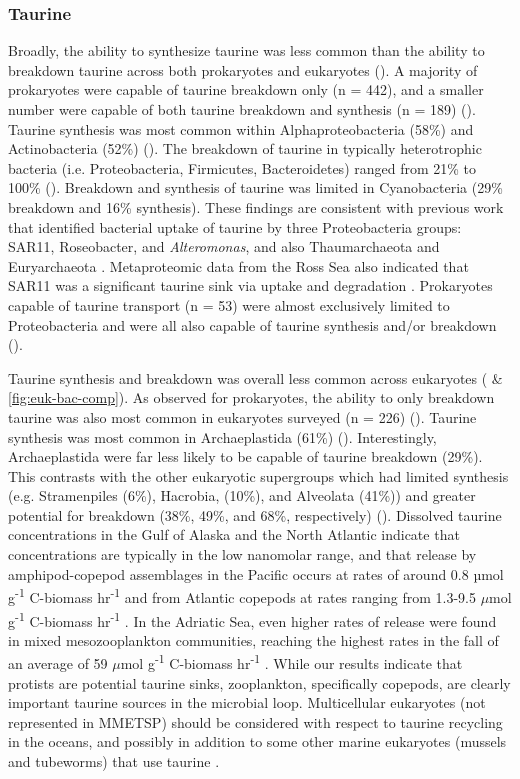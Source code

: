 \documentclass[utf8]{frontiersSCNS} %
\begin{document}
\subsubsection*{Taurine}
Broadly, the ability to synthesize taurine was less common than the ability to breakdown taurine across both prokaryotes and eukaryotes (). A majority of prokaryotes were capable of taurine breakdown only (n = 442), and a smaller number were capable of both taurine breakdown and synthesis (n = 189) (). Taurine synthesis was most common within Alphaproteobacteria (58\%) and Actinobacteria (52\%) (). The breakdown of taurine in typically heterotrophic bacteria (i.e. Proteobacteria, Firmicutes, Bacteroidetes) ranged from 21\% to 100\% (). Breakdown and synthesis of taurine was limited in Cyanobacteria (29\% breakdown and 16\% synthesis). These findings are consistent with previous work that identified bacterial uptake of taurine by three Proteobacteria groups: SAR11, Roseobacter, and \emph{Alteromonas}, and also Thaumarchaeota and Euryarchaeota \citep{Clifford2020,Clifford2019}. Metaproteomic data from the Ross Sea also indicated that SAR11 was a significant taurine sink via uptake and degradation \citep{Williams2012}. Prokaryotes capable of taurine transport (n = 53) were almost exclusively limited to Proteobacteria and were all also capable of taurine synthesis and/or breakdown (). 

Taurine synthesis and breakdown was overall less common across eukaryotes ( \& \ref{fig:euk-bac-comp}). As observed for prokaryotes, the ability to only breakdown taurine was also most common in eukaryotes surveyed (n = 226) (). Taurine synthesis was most common in Archaeplastida (61\%) (). Interestingly, Archaeplastida were far less likely to be capable of taurine breakdown (29\%). This contrasts with the other eukaryotic supergroups which had limited synthesis (e.g. Stramenpiles (6\%), Hacrobia, (10\%), and Alveolata (41\%)) and greater potential for breakdown (38\%, 49\%, and 68\%, respectively) (). Dissolved taurine concentrations in the Gulf of Alaska and the North Atlantic indicate that concentrations are typically in the low nanomolar range, and that release by amphipod-copepod assemblages in the Pacific occurs at rates of around 0.8 µmol g\textsuperscript{-1} C-biomass hr\textsuperscript{-1} and from Atlantic copepods at rates ranging from 1.3-9.5 $\mu$mol g\textsuperscript{-1} C-biomass hr\textsuperscript{-1} \citep{Clifford2017}. In the Adriatic Sea, even higher rates of release were found in mixed mesozooplankton communities, reaching the highest rates in the fall of an average of 59 $\mu$mol g\textsuperscript{-1} C-biomass hr\textsuperscript{-1} \citep{Clifford2020}. While our results indicate that protists are potential taurine sinks, zooplankton, specifically copepods, are clearly important taurine sources in the microbial loop. Multicellular eukaryotes (not represented in MMETSP) should be considered with respect to taurine recycling in the oceans, and possibly in addition to some other marine eukaryotes (mussels and tubeworms) that use taurine \citep{Yin2000,Hosoi2005}.
\end{document}

